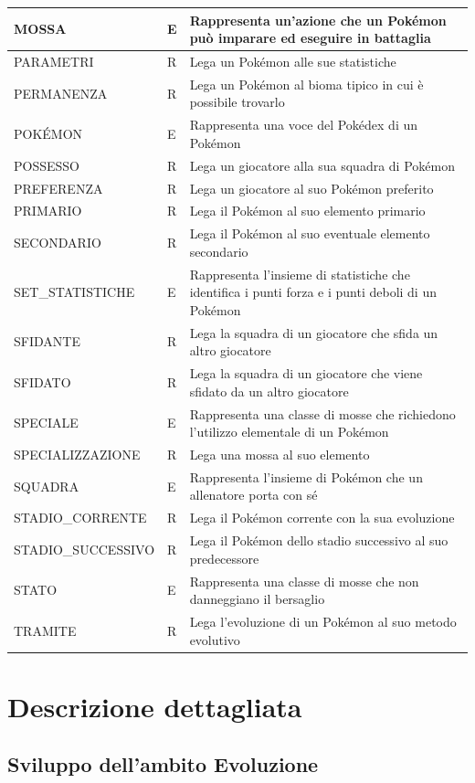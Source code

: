 \documentclass[a4paper,12pt]{report}
\begin{document}
\begin{longtable}{|
>{\raggedright\arraybackslash}m{5cm}|
>{\centering\arraybackslash}m{2cm}|
>{\raggedright\arraybackslash}m{8cm}|}
\hline
MOSSA & E & Rappresenta un'azione che un Pokémon può imparare ed eseguire in battaglia \\
\hline
PARAMETRI & R & Lega un Pokémon alle sue statistiche \\
\hline
PERMANENZA & R & Lega un Pokémon al bioma tipico in cui è possibile trovarlo \\
\hline
POKÉMON & E & Rappresenta una voce del Pokédex di un Pokémon \\
\hline
POSSESSO & R & Lega un giocatore alla sua squadra di Pokémon \\
\hline
PREFERENZA & R & Lega un giocatore al suo Pokémon preferito \\
\hline
PRIMARIO & R & Lega il Pokémon al suo elemento primario \\
\hline
SECONDARIO & R & Lega il Pokémon al suo eventuale elemento secondario \\
\hline
SET\_STATISTICHE & E & Rappresenta l'insieme di statistiche che identifica i punti forza e i punti deboli di un Pokémon \\
\hline
SFIDANTE & R & Lega la squadra di un giocatore che sfida un altro giocatore \\
\hline
SFIDATO & R & Lega la squadra di un giocatore che viene sfidato da un altro giocatore \\
\hline
SPECIALE & E & Rappresenta una classe di mosse che richiedono l'utilizzo elementale di un Pokémon \\
\hline
SPECIALIZZAZIONE & R & Lega una mossa al suo elemento \\
\hline
SQUADRA & E & Rappresenta l'insieme di Pokémon che un allenatore porta con sé \\
\hline
STADIO\_CORRENTE & R & Lega il Pokémon corrente con la sua evoluzione \\
\hline
STADIO\_SUCCESSIVO & R & Lega il Pokémon dello stadio successivo al suo predecessore \\
\hline
STATO & E & Rappresenta una classe di mosse che non danneggiano il bersaglio \\
\hline
TRAMITE & R & Lega l'evoluzione di un Pokémon al suo metodo evolutivo \\
\hline
\end{longtable}

\section{Descrizione dettagliata}

\subsection{Sviluppo dell'ambito Evoluzione}
\end{document}
